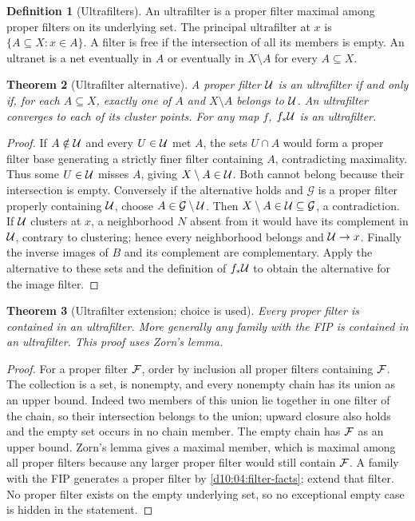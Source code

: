 \documentclass[11pt,oneside,openany]{book}
\newtheorem{theorem}{Theorem}[chapter]
\theoremstyle{definition}
\newtheorem{definition}[theorem]{Definition}
\theoremstyle{remark}
\begin{document}
\begin{definition}[Ultrafilters]\label{d10:05:ultrafilter}
An ultrafilter is a proper filter maximal among proper filters on its underlying set. The principal ultrafilter at $x$ is $\{A\subseteq X:x\in A\}$. A filter is free if the intersection of all its members is empty. An ultranet is a net eventually in $A$ or eventually in $X\setminus A$ for every $A\subseteq X$.
\end{definition}

\begin{theorem}[Ultrafilter alternative]\label{d10:05:ultrafilter-alternative}
A proper filter $\mathcal U$ is an ultrafilter if and only if, for each $A\subseteq X$, exactly one of $A$ and $X\setminus A$ belongs to $\mathcal U$. An ultrafilter converges to each of its cluster points. For any map $f$, $f_*\mathcal U$ is an ultrafilter.
\end{theorem}
\begin{proof}
If $A\notin\mathcal U$ and every $U\in\mathcal U$ met $A$, the sets $U\cap A$ would form a proper filter base generating a strictly finer filter containing $A$, contradicting maximality. Thus some $U\in\mathcal U$ misses $A$, giving $X\setminus A\in\mathcal U$. Both cannot belong because their intersection is empty. Conversely if the alternative holds and $\mathcal G$ is a proper filter properly containing $\mathcal U$, choose $A\in\mathcal G\setminus\mathcal U$. Then $X\setminus A\in\mathcal U\subseteq\mathcal G$, a contradiction. If $\mathcal U$ clusters at $x$, a neighborhood $N$ absent from it would have its complement in $\mathcal U$, contrary to clustering; hence every neighborhood belongs and $\mathcal U\to x$. Finally the inverse images of $B$ and its complement are complementary. Apply the alternative to these sets and the definition of $f_*\mathcal U$ to obtain the alternative for the image filter.
\end{proof}

\begin{theorem}[Ultrafilter extension; choice is used]\label{d10:05:ultrafilter-extension}
Every proper filter is contained in an ultrafilter. More generally any family with the FIP is contained in an ultrafilter. This proof uses Zorn's lemma.
\end{theorem}
\begin{proof}
For a proper filter $\mathcal F$, order by inclusion all proper filters containing $\mathcal F$. The collection is a set, is nonempty, and every nonempty chain has its union as an upper bound. Indeed two members of this union lie together in one filter of the chain, so their intersection belongs to the union; upward closure also holds and the empty set occurs in no chain member. The empty chain has $\mathcal F$ as an upper bound. Zorn's lemma gives a maximal member, which is maximal among all proper filters because any larger proper filter would still contain $\mathcal F$. A family with the FIP generates a proper filter by \cref{d10:04:filter-facts}; extend that filter. No proper filter exists on the empty underlying set, so no exceptional empty case is hidden in the statement.
\end{proof}
\end{document}
